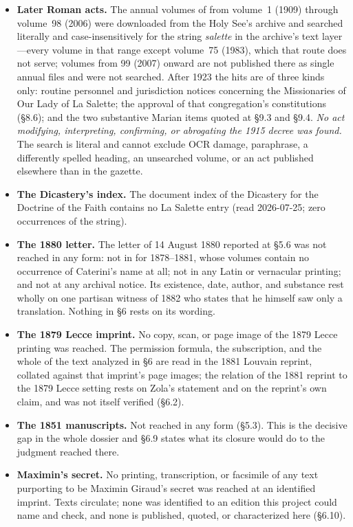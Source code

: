 \begin{itemize}[leftmargin=1.2em,itemsep=0.15em,topsep=0.25em]
\item \textbf{Later Roman acts.} The annual volumes of  from volume~1 (1909) through volume~98 (2006)
were downloaded from the Holy See's archive and searched literally
and case-insensitively for the string \emph{salette} in the
archive's text layer---every volume in that range except volume~75
(1983), which that route does not serve; volumes from 99 (2007)
onward are not published there as single annual files and were not
searched. After 1923 the hits are of three kinds only: routine
personnel and jurisdiction notices concerning the Missionaries of
Our Lady of La Salette; the approval of that congregation's
constitutions (\S8.6); and the two substantive Marian items quoted
at \S9.3 and \S9.4. \emph{No act modifying, interpreting,
confirming, or abrogating the 1915 decree was found.} The search is
literal and cannot exclude OCR damage, paraphrase, a differently
spelled heading, an unsearched volume, or an act published elsewhere
than in the gazette.
\item \textbf{The Dicastery's index.} The document index of the
Dicastery for the Doctrine of the Faith contains no La Salette entry
(read 2026-07-25; zero occurrences of the string).
\item \textbf{The 1880 letter.} The letter of 14 August 1880 reported
at \S5.6 was not reached in any form: not in  for 1878--1881, whose volumes contain no occurrence of
Caterini's name at all; not in any Latin or vernacular printing; and
not at any archival notice. Its existence, date, author, and
substance rest wholly on one partisan witness of 1882 who states
that he himself saw only a translation. Nothing in \S6 rests on its
wording.
\item \textbf{The 1879 Lecce imprint.} No copy, scan, or page image
of the 1879 Lecce printing was reached. The permission formula, the
subscription, and the whole of the text analyzed in \S6 are read in
the 1881 Louvain reprint, collated against that imprint's page
images; the relation of the 1881 reprint to the 1879 Lecce setting
rests on Zola's statement and on the reprint's own claim, and was
not itself verified (\S6.2).
\item \textbf{The 1851 manuscripts.} Not reached in any form
(\S5.3). This is the decisive gap in the whole dossier and \S6.9
states what its closure would do to the judgment reached there.
\item \textbf{Maximin's secret.} No printing, transcription, or
facsimile of any text purporting to be Maximin Giraud's secret was
reached at an identified imprint. Texts circulate; none was
identified to an edition this project could name and check, and
none is published, quoted, or characterized here (\S6.10).
\end{itemize}
